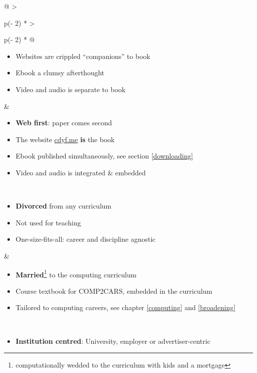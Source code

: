 \documentclass[
]{book}
\providecommand{\tightlist}{%
  \setlength{\itemsep}{0pt}\setlength{\parskip}{0pt}}
\begin{document}
\begin{longtable}[]{@{}
  >{\raggedright\arraybackslash}p{(\columnwidth - 2\tabcolsep) * }
  >{\raggedright\arraybackslash}p{(\columnwidth - 2\tabcolsep) * }@{}}
\begin{minipage}[t]{\linewidth}
\begin{itemize}
  \textbf{Paper first}: web comes second
\item
  Websites are crippled ``companions'' to book
\item
  Ebook a clumsy afterthought
\item
  Video and audio is separate to book
\end{itemize}
\end{minipage} & \begin{minipage}[t]{\linewidth}\raggedright
\begin{itemize}
\tightlist
\item
  \textbf{Web first}: paper comes second
\item
  The website \href{https://www.cdyf.me/}{cdyf.me} \textbf{is } the book
\item
  Ebook published simultaneously, see section \ref{downloading}
\item
  Video and audio is integrated \& embedded
\end{itemize}
\end{minipage} \\
\begin{minipage}[t]{\linewidth}\raggedright
\begin{itemize}
\tightlist
\item
  \textbf{Divorced} from any curriculum
\item
  Not used for teaching
\item
  One-size-fits-all: career and discipline agnostic
\end{itemize}
\end{minipage} & \begin{minipage}[t]{\linewidth}\raggedright
\begin{itemize}
\tightlist
\item
  \textbf{Married}\footnote{computationally wedded to the curriculum with kids and a mortgage} to the computing curriculum
\item
  Course textbook for COMP2CARS, embedded in the curriculum
\item
  Tailored to computing careers, see chapter \ref{computing} and \ref{broadening}
\end{itemize}
\end{minipage} \\
\begin{minipage}[t]{\linewidth}\raggedright
\begin{itemize}
\tightlist
\item
  \textbf{Institution centred}: University, employer or advertiser-centric

\end{itemize}
\end{minipage}
\end{longtable}
\end{document}
